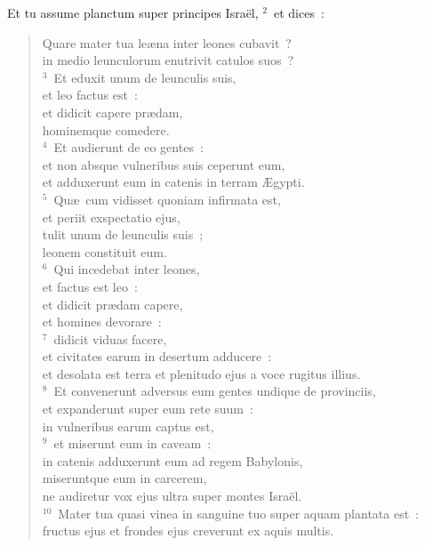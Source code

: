 \lettrine[lines=10,image=true,loversize=0.05,lraise=-0.03]{E}{}t tu assume planctum super principes Isra\"el,
${}^{2}$~et dices~: \begin{flushleft}\begin{verse}Quare mater tua le\ae na inter leones cubavit~?\\ in medio leunculorum enutrivit catulos suos~?\\
${}^{3}$~Et eduxit unum de leunculis suis,\\ et leo factus est~:\\ et didicit capere pr\ae dam,\\ hominemque comedere.\\
${}^{4}$~Et audierunt de eo gentes~:\\ et non absque vulneribus suis ceperunt eum,\\ et adduxerunt eum in catenis in terram \AE gypti.\\
${}^{5}$~Qu\ae\ cum vidisset quoniam infirmata est,\\ et periit exspectatio ejus,\\ tulit unum de leunculis suis~;\\ leonem constituit eum.\\
${}^{6}$~Qui incedebat inter leones,\\ et factus est leo~:\\ et didicit pr\ae dam capere,\\ et homines devorare~:\\
${}^{7}$~didicit viduas facere,\\ et civitates earum in desertum adducere~:\\ et desolata est terra et plenitudo ejus a voce rugitus illius.\\
${}^{8}$~Et convenerunt adversus eum gentes undique de provinciis,\\ et expanderunt super eum rete suum~:\\ in vulneribus earum captus est,\\
${}^{9}$~et miserunt eum in caveam~:\\ in catenis adduxerunt eum ad regem Babylonis,\\ miseruntque eum in carcerem,\\ ne audiretur vox ejus ultra super montes Isra\"el.\\
${}^{10}$~Mater tua quasi vinea in sanguine tuo super aquam plantata est~:\\ fructus ejus et frondes ejus creverunt ex aquis multis.\\

\end{verse}
\end{flushleft}

